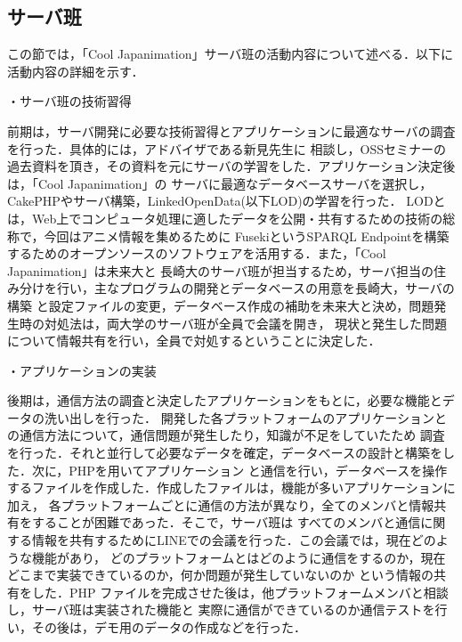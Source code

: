 \subsection{サーバ班}
\par
この節では，「Cool Japanimation」サーバ班の活動内容について述べる．以下に活動内容の詳細を示す．
\par
・サーバ班の技術習得
\par
前期は，サーバ開発に必要な技術習得とアプリケーションに最適なサーバの調査を行った．具体的には，アドバイザである新見先生に
相談し，OSSセミナーの過去資料を頂き，その資料を元にサーバの学習をした．アプリケーション決定後は，「Cool Japanimation」の
サーバに最適なデータベースサーバを選択し，CakePHPやサーバ構築，LinkedOpenData(以下LOD)の学習を行った．
LODとは，Web上でコンピュータ処理に適したデータを公開・共有するための技術の総称で，今回はアニメ情報を集めるために
FusekiというSPARQL Endpointを構築するためのオープンソースのソフトウェアを活用する．また，「Cool Japanimation」は未来大と
長崎大のサーバ班が担当するため，サーバ担当の住み分けを行い，主なプログラムの開発とデータベースの用意を長崎大，サーバの構築
と設定ファイルの変更，データベース作成の補助を未来大と決め，問題発生時の対処法は，両大学のサーバ班が全員で会議を開き，
現状と発生した問題について情報共有を行い，全員で対処するということに決定した．
\par
・アプリケーションの実装
\par
後期は，通信方法の調査と決定したアプリケーションをもとに，必要な機能とデータの洗い出しを行った．
開発した各プラットフォームのアプリケーションとの通信方法について，通信問題が発生したり，知識が不足をしていたため
調査を行った．それと並行して必要なデータを確定，データベースの設計と構築をした．次に，PHPを用いてアプリケーション
と通信を行い，データベースを操作するファイルを作成した．作成したファイルは，機能が多いアプリケーションに加え，
各プラットフォームごとに通信の方法が異なり，全てのメンバと情報共有をすることが困難であった．そこで，サーバ班は
すべてのメンバと通信に関する情報を共有するためにLINEでの会議を行った．この会議では，現在どのような機能があり，
どのプラットフォームとはどのように通信をするのか，現在どこまで実装できているのか，何か問題が発生していないのか
という情報の共有をした．PHP ファイルを完成させた後は，他プラットフォームメンバと相談し，サーバ班は実装された機能と
実際に通信ができているのか通信テストを行い，その後は，デモ用のデータの作成などを行った．



